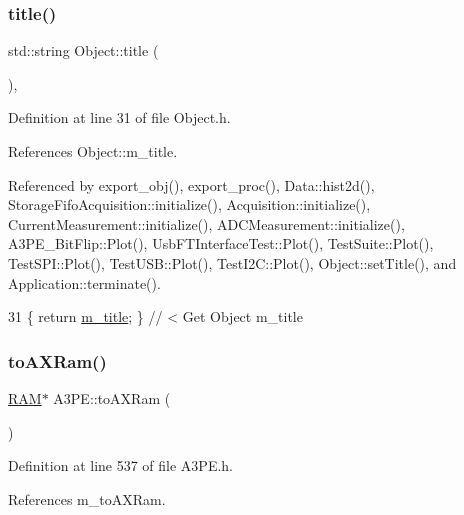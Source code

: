 \subsubsection{\texorpdfstring{title()}{title()}}
{\footnotesize\ttfamily std\+::string Object\+::title (\begin{DoxyParamCaption}{ }\end{DoxyParamCaption})\hspace{0.3cm}{\ttfamily [inline]}, {\ttfamily [inherited]}}



Definition at line 31 of file Object.\+h.



References Object\+::m\+\_\+title.



Referenced by export\+\_\+obj(), export\+\_\+proc(), Data\+::hist2d(), Storage\+Fifo\+Acquisition\+::initialize(), Acquisition\+::initialize(), Current\+Measurement\+::initialize(), A\+D\+C\+Measurement\+::initialize(), A3\+P\+E\+\_\+\+Bit\+Flip\+::\+Plot(), Usb\+F\+T\+Interface\+Test\+::\+Plot(), Test\+Suite\+::\+Plot(), Test\+S\+P\+I\+::\+Plot(), Test\+U\+S\+B\+::\+Plot(), Test\+I2\+C\+::\+Plot(), Object\+::set\+Title(), and Application\+::terminate().


\begin{DoxyCode}
31 \{ \textcolor{keywordflow}{return} \hyperlink{classObject_affbeea1953eb5163573b92fad8f75727}{m\_title};      \} \textcolor{comment}{// < Get Object m\_title}
\end{DoxyCode}
\mbox{\label{classA3PE_a16b16ac12705b9dd93d70fa172deb584}} 
\subsubsection{\texorpdfstring{to\+A\+X\+Ram()}{toAXRam()}}
{\footnotesize\ttfamily \hyperlink{classRAM}{R\+AM}$\ast$ A3\+P\+E\+::to\+A\+X\+Ram (\begin{DoxyParamCaption}{ }\end{DoxyParamCaption})\hspace{0.3cm}{\ttfamily [inline]}}



Definition at line 537 of file A3\+P\+E.\+h.



References m\+\_\+to\+A\+X\+Ram.



